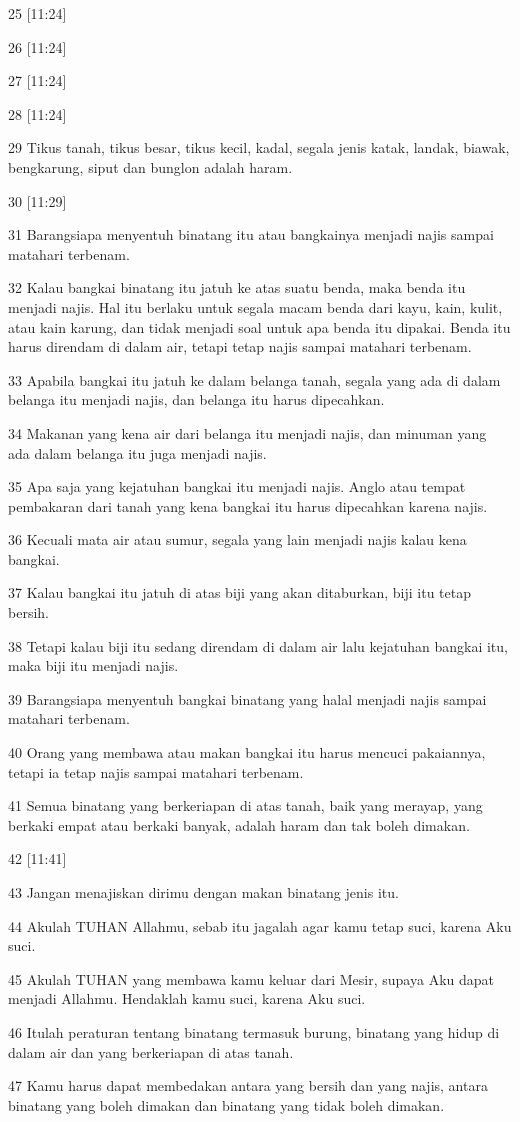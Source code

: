\par 25 [11:24]
\par 26 [11:24]
\par 27 [11:24]
\par 28 [11:24]
\par 29 Tikus tanah, tikus besar, tikus kecil, kadal, segala jenis katak, landak, biawak, bengkarung, siput dan bunglon adalah haram.
\par 30 [11:29]
\par 31 Barangsiapa menyentuh binatang itu atau bangkainya menjadi najis sampai matahari terbenam.
\par 32 Kalau bangkai binatang itu jatuh ke atas suatu benda, maka benda itu menjadi najis. Hal itu berlaku untuk segala macam benda dari kayu, kain, kulit, atau kain karung, dan tidak menjadi soal untuk apa benda itu dipakai. Benda itu harus direndam di dalam air, tetapi tetap najis sampai matahari terbenam.
\par 33 Apabila bangkai itu jatuh ke dalam belanga tanah, segala yang ada di dalam belanga itu menjadi najis, dan belanga itu harus dipecahkan.
\par 34 Makanan yang kena air dari belanga itu menjadi najis, dan minuman yang ada dalam belanga itu juga menjadi najis.
\par 35 Apa saja yang kejatuhan bangkai itu menjadi najis. Anglo atau tempat pembakaran dari tanah yang kena bangkai itu harus dipecahkan karena najis.
\par 36 Kecuali mata air atau sumur, segala yang lain menjadi najis kalau kena bangkai.
\par 37 Kalau bangkai itu jatuh di atas biji yang akan ditaburkan, biji itu tetap bersih.
\par 38 Tetapi kalau biji itu sedang direndam di dalam air lalu kejatuhan bangkai itu, maka biji itu menjadi najis.
\par 39 Barangsiapa menyentuh bangkai binatang yang halal menjadi najis sampai matahari terbenam.
\par 40 Orang yang membawa atau makan bangkai itu harus mencuci pakaiannya, tetapi ia tetap najis sampai matahari terbenam.
\par 41 Semua binatang yang berkeriapan di atas tanah, baik yang merayap, yang berkaki empat atau berkaki banyak, adalah haram dan tak boleh dimakan.
\par 42 [11:41]
\par 43 Jangan menajiskan dirimu dengan makan binatang jenis itu.
\par 44 Akulah TUHAN Allahmu, sebab itu jagalah agar kamu tetap suci, karena Aku suci.
\par 45 Akulah TUHAN yang membawa kamu keluar dari Mesir, supaya Aku dapat menjadi Allahmu. Hendaklah kamu suci, karena Aku suci.
\par 46 Itulah peraturan tentang binatang termasuk burung, binatang yang hidup di dalam air dan yang berkeriapan di atas tanah.
\par 47 Kamu harus dapat membedakan antara yang bersih dan yang najis, antara binatang yang boleh dimakan dan binatang yang tidak boleh dimakan.

